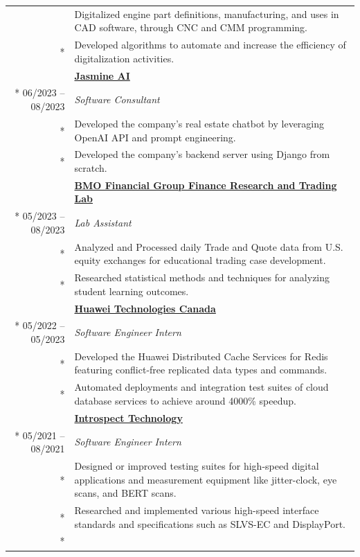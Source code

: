 \documentclass{article}
\begin{document}
\begin{tabularx}{\textwidth}{r X}
		& {\small Digitalized engine part definitions, manufacturing, and uses in CAD software, through CNC and CMM programming.} \\*
		& {\small Developed algorithms to automate and increase the efficiency of digitalization activities.} \\
		\iftoggle{verbose}{
			\addlinespace
			& \textbf{\href{https://jasminechatbot.com/}{Jasmine AI}} \\*
			06/2023 -- 08/2023 & \textit{Software Consultant} \\*
			& {\small Developed the company's real estate chatbot by leveraging OpenAI API and prompt engineering.} \\*
			& {\small Developed the company's backend server using Django from scratch.} \\
		}{}
		\addlinespace
		& \textbf{\href{https://inside.rotman.utoronto.ca/financelab/}{BMO Financial Group Finance Research and Trading Lab}} \\*
		05/2023 -- 08/2023 & \textit{Lab Assistant} \\*
		& {\small Analyzed and Processed daily Trade and Quote data from U.S. equity exchanges for educational trading case development.} \\*
		& {\small Researched statistical methods and techniques for analyzing student learning outcomes.} \\
		\addlinespace
		& \textbf{\href{https://www.huawei.com/ca/}{Huawei Technologies Canada}} \\*
		05/2022 -- 05/2023 & \textit{Software Engineer Intern} \\*
		& {\small Developed the Huawei Distributed Cache Services for Redis featuring conflict-free replicated data types and commands.} \\*
		& {\small Automated deployments and integration test suites of cloud database services to achieve around 4000\% speedup.} \\
		\addlinespace
		& \textbf{\href{https://introspect.ca/}{Introspect Technology}} \\*
		05/2021 -- 08/2021 & \textit{Software Engineer Intern} \\*
		& {\small Designed or improved testing suites for high-speed digital applications and measurement equipment like jitter-clock, eye scans, and BERT scans.} \\*
		& {\small Researched and implemented various high-speed interface standards and specifications such as SLVS-EC and DisplayPort.} \\*
	\end{tabularx}
\end{document}
